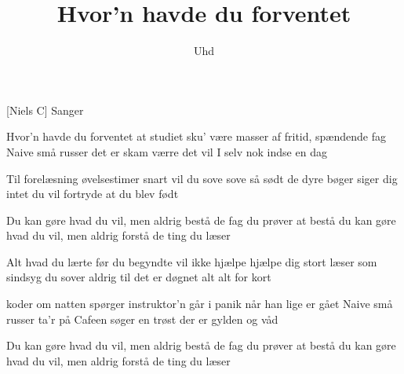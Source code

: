 \documentclass[a4paper,11pt]{article}
\title{Hvor'n havde du forventet}
\author{Uhd}
\begin{document}
\maketitle

\begin{roles}
[Niels C] Sanger
\end{roles}

\begin{props}
\end{props}

\begin{song}
  
  Hvor'n havde du forventet 
  at studiet sku' være
  masser af fritid, spændende fag
  Naive små russer 
  det er skam værre
  det vil I selv nok
  indse en dag
  
  Til forelæsning
  øvelsestimer
  snart vil du sove
  sove så sødt
  de dyre bøger
  siger dig intet
  du vil fortryde
  at du blev født
  
  Du kan gøre hvad du vil, men aldrig bestå de fag
  du prøver at bestå
  du kan gøre hvad du vil, men aldrig forstå de ting
  du læser
  
  Alt hvad du lærte
  før du begyndte
  vil ikke hjælpe
  hjælpe dig stort
  læser som sindsyg
  du sover aldrig
  til det er døgnet
  alt alt for kort
  
  koder om natten
  spørger instruktor'n
  går i panik når
  han lige er gået
  Naive små russer
  ta'r på Cafeen
  søger en trøst der
  er gylden og våd

  Du kan gøre hvad du vil, men aldrig bestå de fag
  du prøver at bestå
  du kan gøre hvad du vil, men aldrig forstå de ting
  du læser

\end{song}
\end{document}
